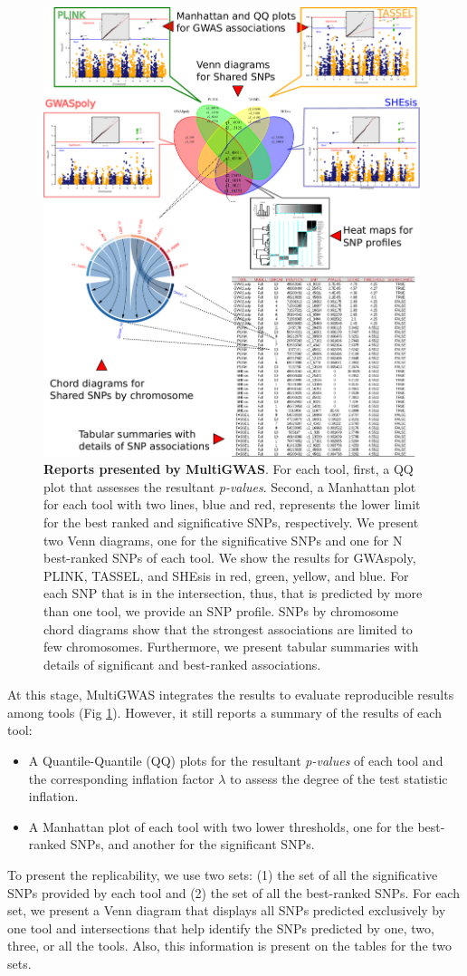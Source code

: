 \documentclass{article}
\begin{document}
\begin{figure}
\includegraphics[width=11cm]{04_figure-methodologies-all-plots} \caption{\textbf{Reports presented by MultiGWAS}. For each tool, first, a QQ plot that assesses the resultant \emph{p-values}. Second, a Manhattan plot for each tool with two lines, blue and red, represents the lower limit for the best ranked and significative SNPs, respectively. We present two Venn diagrams, one for the significative SNPs and one for N best-ranked SNPs of each tool. We show the results for GWAspoly, PLINK, TASSEL, and SHEsis in red, green, yellow, and blue. For each SNP that is in the intersection, thus, that is predicted by more than one tool, we provide an SNP profile. SNPs by chromosome chord diagrams show that the strongest associations are limited to few chromosomes. Furthermore, we present tabular summaries with details of significant and best-ranked associations.\label{fig: Reports} }
\end{figure}
At this stage, MultiGWAS integrates the results to evaluate reproducible results among tools (Fig \ref{fig: Reports}). However, it still reports a summary of the results of each tool: 
\begin{itemize}
\item A Quantile-Quantile (QQ) plots for the resultant \emph{p-values} of each tool and the corresponding inflation factor $\lambda$ to assess the degree of the test statistic inflation. 
\item A Manhattan plot of each tool with two lower thresholds, one for the best-ranked SNPs, and another for the significant SNPs. 
\end{itemize}
To present the replicability, we use two sets: (1) the set of all the significative SNPs provided by each tool and (2) the set of all the best-ranked SNPs. For each set, we present a Venn diagram that displays all SNPs predicted exclusively by one tool and intersections that help identify the SNPs predicted by one, two, three, or all the tools. Also, this information is present on the tables for the two sets.
\end{document}
